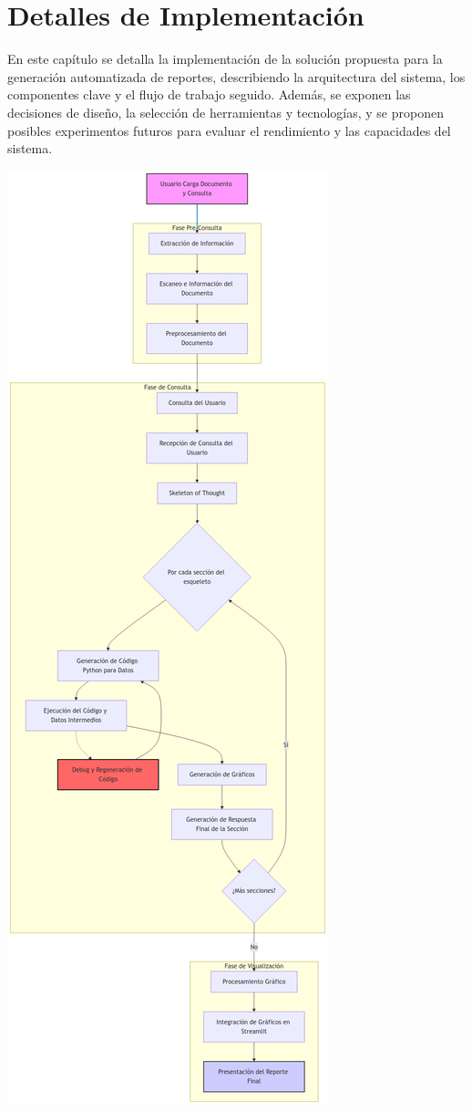 \section{Detalles de Implementación}\label{chapter:implementation}

En este capítulo se detalla la implementación de la solución propuesta para la generación automatizada de reportes, describiendo la arquitectura del sistema, los componentes clave y el flujo de trabajo seguido.  Además, se exponen las decisiones de diseño, la selección de herramientas y tecnologías, y se proponen posibles experimentos futuros para evaluar el rendimiento y las capacidades del sistema.

\includegraphics[height=\textheight]{Graphics/graph.png}


